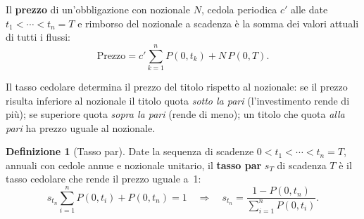 \documentclass[11pt,a4paper]{article}
\theoremstyle{plain}
\theoremstyle{definition}
\newtheorem{definizione}[teorema]{Definizione}
\theoremstyle{remark}
\begin{document}
Il \textbf{prezzo} di un'obbligazione con nozionale $N$, cedola periodica $c'$ alle
date $t_1 < \cdots < t_n = T$ e rimborso del nozionale a scadenza \`e la somma dei valori
attuali di tutti i flussi:
\begin{equation}
  \text{Prezzo} = c' \sum_{k=1}^{n} P(0,t_k) + N\,P(0,T).
  \label{eq:prezzo-bond}
\end{equation}

Il tasso cedolare determina il prezzo del titolo rispetto al nozionale: se il prezzo risulta
inferiore al nozionale il titolo quota \emph{sotto la pari} (l'investimento rende di pi\`u); se
superiore quota \emph{sopra la pari} (rende di meno); un titolo che quota \emph{alla pari} ha
prezzo uguale al nozionale.
\begin{definizione}[Tasso par]
\label{def:par}
Date la sequenza di scadenze $0 < t_1 < \cdots < t_n = T$,  annuali con cedole annue e nozionale unitario, il \textbf{tasso par} $s_T$ di scadenza $T$ \`e
il tasso cedolare che rende il prezzo uguale a~1:
\begin{equation}
  \label{eq:tasso_par}
  s_{t_n} \sum_{i=1}^{n} P(0,t_i) + P(0,t_n) = 1
  \quad\Longrightarrow\quad
  s_{t_n} = \frac{1 - P(0,t_n)}{\displaystyle\sum_{i=1}^{n} P(0,t_i)}.
\end{equation}
\end{definizione}
\end{document}
